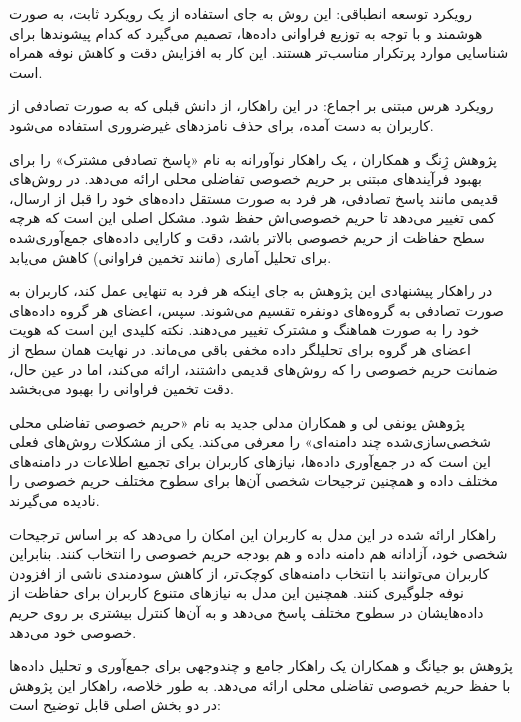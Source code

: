
 رویکرد توسعه انطباقی: این روش به جای استفاده از یک رویکرد ثابت، به صورت هوشمند و با توجه به توزیع فراوانی داده‌ها، تصمیم می‌گیرد که کدام پیشوندها برای شناسایی موارد پرتکرار مناسب‌تر هستند. این کار به افزایش دقت و کاهش نوفه همراه است.

 رویکرد هرس مبتنی بر اجماع: در این راهکار، از دانش قبلی که به صورت تصادفی از کاربران به دست آمده، برای حذف نامزدهای غیرضروری استفاده می‌شود.



پژوهش ژِنگ و همکاران ، یک راهکار نوآورانه به نام «پاسخ تصادفی مشترک» را برای بهبود فرآیندهای مبتنی بر حریم خصوصی تفاضلی محلی ارائه می‌دهد. در روش‌های قدیمی مانند پاسخ تصادفی، هر فرد به صورت مستقل داده‌های خود را قبل از ارسال، کمی تغییر می‌دهد تا حریم خصوصی‌اش حفظ شود. مشکل اصلی این است که هرچه سطح حفاظت از حریم خصوصی بالاتر باشد، دقت و کارایی داده‌های جمع‌آوری‌شده برای تحلیل آماری (مانند تخمین فراوانی) کاهش می‌یابد.

در راهکار پیشنهادی این پژوهش به جای اینکه هر فرد به تنهایی عمل کند، کاربران به صورت تصادفی به گروه‌های دونفره تقسیم می‌شوند. سپس، اعضای هر گروه داده‌های خود را به صورت هماهنگ و مشترک تغییر می‌دهند. نکته کلیدی این است که هویت اعضای هر گروه برای تحلیلگر داده مخفی باقی می‌ماند. در نهایت همان سطح از ضمانت حریم خصوصی را که روش‌های قدیمی داشتند، ارائه می‌کند، اما در عین حال، دقت تخمین فراوانی را بهبود می‌بخشد.


پژوهش یونفی لی و همکاران  مدلی جدید به نام «حریم خصوصی تفاضلی محلی شخصی‌سازی‌شده چند دامنه‌ای» را معرفی می‌کند. یکی از مشکلات روش‌های فعلی این است که در جمع‌آوری داده‌ها، نیازهای کاربران برای تجمیع اطلاعات در دامنه‌های مختلف داده و همچنین ترجیحات شخصی آن‌ها برای سطوح مختلف حریم خصوصی را نادیده می‌گیرند.

راهکار ارائه شده در این مدل به کاربران این امکان را می‌دهد که بر اساس ترجیحات شخصی خود، آزادانه هم دامنه داده و هم بودجه حریم خصوصی را انتخاب کنند. بنابراین کاربران می‌توانند با انتخاب دامنه‌های کوچک‌تر، از کاهش سودمندی ناشی از افزودن نوفه جلوگیری کنند. همچنین این مدل به نیازهای متنوع کاربران برای حفاظت از داده‌هایشان در سطوح مختلف پاسخ می‌دهد و به آن‌ها کنترل بیشتری بر روی حریم خصوصی خود می‌دهد.


پژوهش بو جیانگ و همکاران  یک راهکار جامع و چندوجهی برای جمع‌آوری و تحلیل داده‌ها با حفظ حریم خصوصی تفاضلی محلی ارائه می‌دهد. به طور خلاصه، راهکار این پژوهش در دو بخش اصلی قابل توضیح است:

